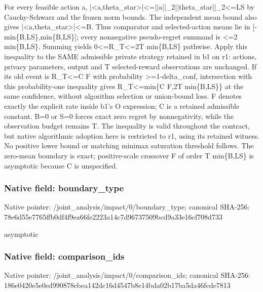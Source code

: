 \documentclass[10pt,a4paper]{article}
\begin{document}
\begingroup\raggedright\sloppy For every feasible action a,\allowbreak{} |<a,\allowbreak{}theta\_\allowbreak{}star>|<=\allowbreak{}||a||\_\allowbreak{}2||theta\_\allowbreak{}star||\_\allowbreak{}2<=\allowbreak{}LS by Cauchy-Schwarz and the frozen norm bounds. The independent mean bound also gives |<a,\allowbreak{}theta\_\allowbreak{}star>|<=\allowbreak{}B. Thus comparator and selected-action means lie in [-min\{B,\allowbreak{}LS\},\allowbreak{}min\{B,\allowbreak{}LS\}];\allowbreak{} every nonnegative pseudo-regret summand is <=\allowbreak{}2 min\{B,\allowbreak{}LS\}. Summing yields 0<=\allowbreak{}R\_\allowbreak{}T<=\allowbreak{}2T min\{B,\allowbreak{}LS\} pathwise. Apply this inequality to the SAME admissible private strategy retained in b1 on r1:\allowbreak{} actions,\allowbreak{} privacy parameters,\allowbreak{} output and T selected-reward observations are unchanged. If its old event is R\_\allowbreak{}T<=\allowbreak{}C F with probability >=\allowbreak{}1-delta\_\allowbreak{}conf,\allowbreak{} intersection with this probability-one inequality gives R\_\allowbreak{}T<=\allowbreak{}min\{C F,\allowbreak{}2T min\{B,\allowbreak{}LS\}\} at the same confidence,\allowbreak{} without algorithm selection or union-bound loss. F denotes exactly the explicit rate inside b1's O expression;\allowbreak{} C is a retained admissible constant. B=\allowbreak{}0 or S=\allowbreak{}0 forces exact zero regret by nonnegativity,\allowbreak{} while the observation budget remains T. The inequality is valid throughout the contract,\allowbreak{} but native algorithmic adoption here is restricted to r1,\allowbreak{} using its retained witness. No positive lower bound or matching minimax saturation threshold follows. The zero-mean boundary is exact;\allowbreak{} positive-scale crossover F of order T min\{B,\allowbreak{}LS\} is asymptotic because C is unspecified.\par\endgroup

\subsubsection{Native field: boundary\_\allowbreak{}type}
Native pointer: /joint\_\allowbreak{}analysis/impact/0/boundary\_\allowbreak{}type; canonical SHA-256: 78e6d55e7765ffb0df4f9ea66fe2223a14c7d96737509bcd9a33e16cf708d733

\begingroup\raggedright\sloppy asymptotic\par\endgroup

\subsubsection{Native field: comparison\_\allowbreak{}ids}
Native pointer: /joint\_\allowbreak{}analysis/impact/0/comparison\_\allowbreak{}ids; canonical SHA-256: 186e0420e5e0ed990878ebea142dc16d4547b8e14bda02b17ba5da46fcde7813
\end{document}
